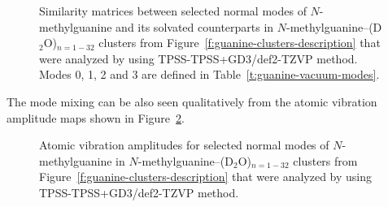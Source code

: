 \documentclass[a4paper,titlepage,twoside,fleqn,12pt]{book}
\begin{document}
\begin{figure}[t!]
\centering
\setlength\fboxsep{0.4pt}
\setlength\fboxrule{0.5pt}
\caption{
Similarity matrices between selected normal modes of
$N$-methylguanine and its solvated counterparts
in $N$-methylguanine--(D$_2$O)$_{n=1-32}$ clusters from 
Figure~\ref{f:guanine-clusters-description} that were analyzed
by using TPSS-TPSS+GD3/def2-TZVP method. Modes 0, 1, 2 and 3
are defined in Table~\ref{t:guanine-vacuum-modes}.
\label{f:guanine-clusters-umat}}
\end{figure}
%
The mode mixing can be also seen qualitatively
from the atomic vibration amplitude maps shown
in Figure~\ref{f:guanine-clusters-amplitudes}.
%
\begin{figure}[t!]
\centering
\setlength\fboxsep{0.4pt}
\setlength\fboxrule{0.5pt}
\caption{
Atomic vibration amplitudes for selected normal modes of
$N$-methylguanine
in $N$-methylguanine--(D$_2$O)$_{n=1-32}$ clusters from 
Figure~\ref{f:guanine-clusters-description} that were analyzed
by using TPSS-TPSS+GD3/def2-TZVP method.
\label{f:guanine-clusters-amplitudes}}
\end{figure}
%
\end{document}
